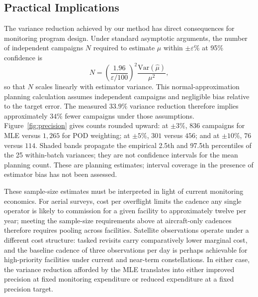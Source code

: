 \documentclass[numsec,webpdf,modern,mediumone]{oup-authoring-template}
\newcommand{\new}[1]{#1}
\begin{document}
\subsection{Practical Implications}

The variance reduction achieved by our method has direct consequences for monitoring program design. Under standard asymptotic arguments, the number of independent campaigns $N$ required to estimate $\mu$ within $\pm\varepsilon\%$ at 95\% confidence is
\begin{equation}
    N = \left(\frac{1.96}{\varepsilon/100}\right)^{\!2} \frac{\mathrm{Var}(\hat{\mu})}{\mu^2},
    \label{eq:sample_size}
\end{equation}
so that $N$ scales linearly with estimator variance. This normal-approximation planning calculation assumes independent campaigns and negligible bias relative to the target error. The measured $33.9\%$ variance reduction therefore implies approximately $34\%$ fewer campaigns under those assumptions. Figure~\ref{fig:precision} gives counts rounded upward: at $\pm3\%$, $836$ campaigns for MLE versus $1{,}265$ for POD weighting; at $\pm5\%$, $301$ versus $456$; and at $\pm10\%$, $76$ versus $114$. Shaded bands propagate the empirical 2.5th and 97.5th percentiles of the 25 within-batch variances; they are not confidence intervals for the mean planning count. These are planning estimates; interval coverage in the presence of estimator bias has not been assessed.

\new{These sample-size estimates must be interpreted in light of current monitoring economics. For aerial surveys, cost per overflight limits the cadence any single operator is likely to commission for a given facility to approximately twelve per year; meeting the sample-size requirements above at aircraft-only cadences therefore requires pooling across facilities. Satellite observations operate under a different cost structure: tasked revisits carry comparatively lower marginal cost, and the baseline cadence of three observations per day is perhaps achievable for high-priority facilities under current and near-term constellations. In either case, the variance reduction afforded by the MLE translates into either improved precision at fixed monitoring expenditure or reduced expenditure at a fixed precision target.}
\end{document}
